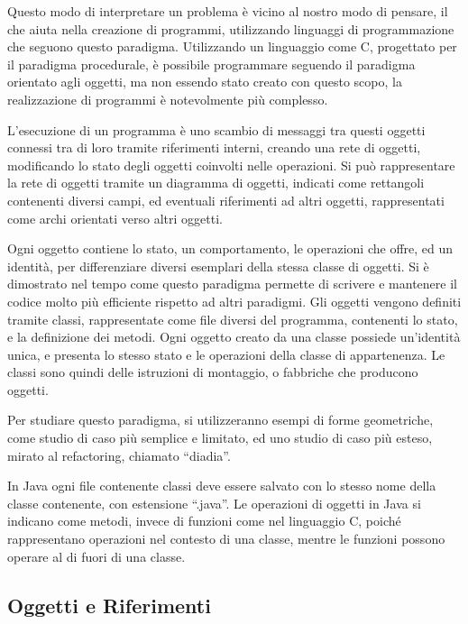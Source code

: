 \documentclass{article}
\numberwithin{equation}{subsection}
\begin{document}
Questo modo di interpretare un problema è vicino al nostro modo di pensare, il che aiuta nella creazione di programmi, utilizzando linguaggi di programmazione che seguono 
questo paradigma. Utilizzando un linguaggio come C, progettato per il paradigma procedurale, è possibile programmare seguendo il paradigma orientato agli oggetti, ma non essendo 
stato creato con questo scopo, la realizzazione di programmi è notevolmente più complesso. 


L'esecuzione di un programma è uno scambio di messaggi tra questi oggetti connessi tra di loro tramite riferimenti interni, creando una rete di oggetti, modificando lo stato 
degli oggetti coinvolti nelle operazioni. Si può rappresentare la rete di oggetti tramite un diagramma di oggetti, indicati come rettangoli contenenti diversi campi, ed 
eventuali riferimenti ad altri oggetti, rappresentati come archi orientati verso altri oggetti. 

Ogni oggetto contiene lo stato, un comportamento, le operazioni che offre, ed un identità, per differenziare diversi esemplari della stessa classe di oggetti. Si è dimostrato 
nel tempo come questo paradigma permette di scrivere e mantenere il codice molto più efficiente rispetto ad altri paradigmi. 
Gli oggetti vengono definiti tramite classi, rappresentate come file diversi del programma, contenenti lo stato, e la definizione dei metodi. Ogni oggetto creato da una classe 
possiede un'identità unica, e presenta lo stesso stato e le operazioni della classe di appartenenza. Le classi sono quindi delle istruzioni di montaggio, o fabbriche che 
producono oggetti. 


Per studiare questo paradigma, si utilizzeranno esempi di forme geometriche, come studio di caso più semplice e limitato, ed uno studio di caso più esteso, mirato al 
refactoring, chiamato ``diadia''. 


In Java ogni file contenente classi deve essere salvato con lo stesso nome della classe contenente, con estensione ``.java''. Le operazioni di oggetti in Java si indicano 
come metodi, invece di funzioni come nel linguaggio C, poiché rappresentano operazioni nel contesto di una classe, mentre le funzioni possono operare al di fuori di una classe. 

\subsection{Oggetti e Riferimenti}
\end{document}
